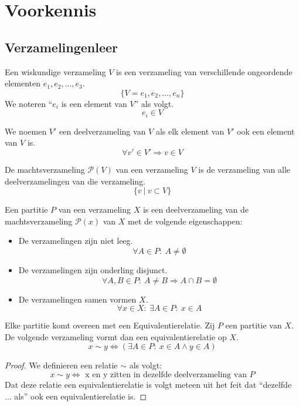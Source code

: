 \documentclass[main.tex]{subfiles}
\begin{document}
\chapter{Voorkennis}
\label{cha:voorkennis}

\section{Verzamelingenleer}
\label{sec:verzamelingenleer}

\begin{de}
  Een wiskundige verzameling $V$ is een verzameling van verschillende ongeordende elementen $e_1,e_2,\ldots,e_3$.
  \[ \{V = e_1,e_2,\ldots,e_n\} \]
  We noteren ``$e_i$ is een element van $V$'' als volgt.
  \[ e_i \in V \]
\end{de}

\begin{de}
  We noemen $V'$ een deelverzameling van $V$ als elk element van $V'$ ook een element van $V$ is.
  \[ \forall v' \in V' \Rightarrow v \in V \]
\end{de}

\begin{de}
  De machtsverzameling $\mathcal{P}(V)$ van een verzameling $V$ is de verzameling van alle deelverzamelingen van die verzameling.
  \[ \{v\ |\ v\subset V \}\] 
\end{de}

\begin{de}
  \label{de:partitie}
  Een partitie $P$ van een verzameling $X$ is een deelverzameling van de machtsverzameling $\mathcal {P}(x)$ van $X$ met de volgende eigenschappen:
  \begin{itemize}
  \item De verzamelingen zijn niet leeg.
    \[ \forall A \in P:\ A \neq \emptyset \]
  \item De verzamelingen zijn onderling disjunct.
    \[ \forall A,B \in P:\ A \neq B \Rightarrow A \cap B = \emptyset \]
  \item De verzamelingen samen vormen $X$.
    \[ \forall x \in X:\ \exists A \in P:\ x \in A \]
  \end{itemize}
\end{de}

\begin{st}
  \label{st:verband-partitie-equivalentierelatie}
  Elke partitie komt overeen met een Equivalentierelatie. Zij $P$ een partitie van $X$.
  De volgende verzameling vormt dan een equivalentierelatie op $X$.
  \[ x \sim y \Leftrightarrow (\exists A \in P:\ x \in A \wedge y \in A )\]

  \begin{proof}
    We definieren een relatie $\sim$ als volgt:
    \[
    x \sim y \Leftrightarrow \text{ x en y zitten in dezelfde deelverzameling van } P
    \]
    Dat deze relatie een equivalentierelatie is volgt meteen uit het feit dat ``dezelfde ... als'' ook een equivalentierelatie is.
  \end{proof}
\end{st}
\end{document}
